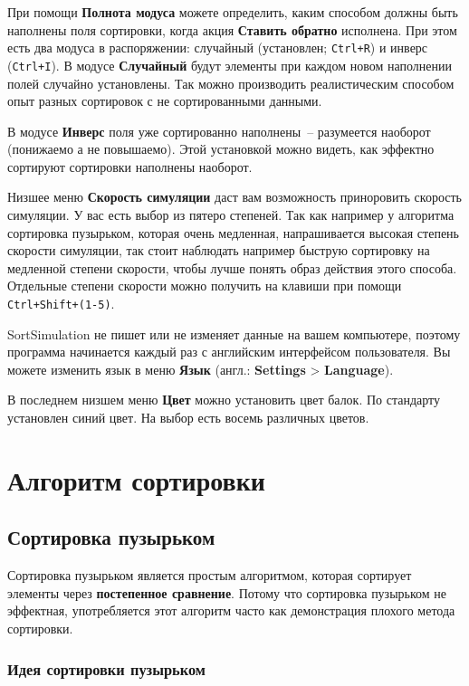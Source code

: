 \documentclass[11pt, a4paper, titlepage, twoside]{article}
\renewcommand{\emph}{\textbf}
\begin{document}
	При помощи \emph{Полнота модуса} можете определить, каким способом должны быть наполнены поля сортировки, когда акция \emph{Ставить обратно} исполнена. При этом есть два модуса в распоряжении: случайный  (установлен; \texttt{Ctrl+R}) и инверс (\texttt{Ctrl+I}). В модусе \emph{Случайный} будут элементы при каждом новом наполнении полей случайно установлены. Так можно производить реалистическим способом опыт разных сортировок с не сортированными данными.
	
	В модусе \emph{Инверс} поля уже сортированно наполнены~-- разумеется наоборот (понижаемо а не повышаемо). Этой установкой можно видеть, как эффектно сортируют сортировки наполнены наоборот.
	
	Низшее меню \emph{Скорость симуляции} даст вам возможность приноровить скорость симуляции. У вас есть выбор из пятеро степеней. Так как например у алгоритма сортировка пузырьком, которая очень медленная, напрашивается высокая степень скорости симуляции, так стоит наблюдать например быструю сортировку на медленной степени скорости, чтобы лучше понять образ действия этого способа. Отдельные степени скорости можно получить на клавиши при помощи \texttt{Ctrl+Shift+(1-5)}.
	
	SortSimulation не пишет или не изменяет данные на вашем компьютере, поэтому программа начинается каждый раз с английским интерфейсом пользователя. Вы можете изменить язык в меню \emph{Язык} (англ.: \emph{Settings} > \emph{Language}).
	
	В последнем низшем меню \emph{Цвет} можно установить цвет балок. По стандарту установлен синий цвет. На выбор есть восемь различных цветов.
	
	\section{Алгоритм сортировки}
	
	\subsection{Сортировка пузырьком}
	
	Сортировка пузырьком является простым алгоритмом, которая сортирует элементы через \emph{постепенное сравнение}. Потому что сортировка пузырьком не эффектная, употребляется этот алгоритм часто как демонстрация плохого метода сортировки.
	
	\subsubsection{Идея сортировки пузырьком}
	
\end{document}
